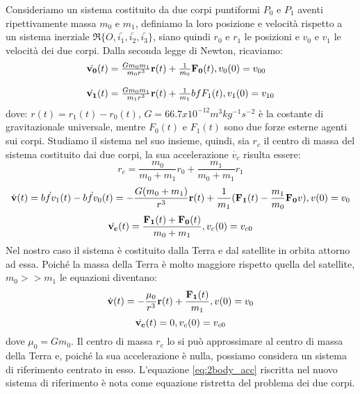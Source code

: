 Consideriamo un sistema costituito da due corpi puntiformi $P_0$ e
$P_1$ aventi ripettivamente massa $m_0$ e $m_1$, definiamo la loro posizione e
velocità rispetto a un sistema inerziale $\mathfrak{R} \{
O,\bar{i_1},\bar{i_2},\bar{i_3}\}$, siano quindi $r_0$ e $r_1$ le posizioni e
$v_0$ e $v_1$ le velocità dei due corpi. Dalla seconda legge di Newton,
ricaviamo:
\begin{equation}
\begin{array}{l}
\dot{\bf v_0}(t)=\frac{Gm_0m_1}{m_0r^3}{\bf r}(t) +
\frac{1}{m_0}{\bf F_0}(t),v_0(0)=v_{00}\\\\
\dot{\bf v_1}(t)=\frac{Gm_0m_1}{m_1r^3}{\bf r}(t) +
\frac{1}{m_1}{bf F_1}(t),v_1(0)=v_{10}
\end{array}
\end{equation}
dove: $r(t)=r_1(t)-r_0(t)$, $G=66.7x10^{-12} m^3kg^{-1}s^{-2}$ è la costante di
gravitazionale universale, mentre $F_0(t)$ e $F_1(t)$ sono due forze esterne
agenti sui corpi.
Studiamo il sistema nel suo insieme, quindi, sia $r_c$ il centro di massa del
sistema costituito dai due corpi, la sua accelerazione $\dot{v_c}$ risulta essere:
\[r_c=\frac{m_0}{m_0+m_1}r_0+\frac{m_1}{m_0+m_1}r_1\]
\begin{equation}
\dot{\bf v}(t)=\dot{bf v_1}(t)-\dot{bf v_0}(t)=-\frac{G(m_0+m_1)}{r^3}{\bf
r}(t)+\frac{1}{m_1}({\bf F_1}(t)-\frac{m_1}{m_0}{\bf F_0}v), v(0)=v_0
\end{equation}
\begin{equation}
\dot{\bf v_c}(t)=\frac{{\bf F_1}(t)+{\bf F_0}(t)}{m_0+m_1},v_c(0)=v_{c0}
\end{equation}
Nel nostro caso il sistema è costituito dalla Terra e dal satellite in orbita
attorno ad essa. Poiché la massa della Terra è molto maggiore rispetto quella
del satellite, $m_0>>m_1$ le equazioni diventano:
\begin{equation}
\dot{\bf v}(t)=-\frac{\mu_0}{r^3}{\bf r}(t)+\frac{{\bf F_1}(t)}{m_1}, v(0)=v_0
\label{eq:2body_acc}
\end{equation}
\begin{equation}
\dot{\bf v_c}(t)=0, v_c(0)=v_{c0}
\end{equation}
dove $\mu_0=Gm_0$.
Il centro di massa $r_c$ lo si può approssimare al centro di massa della Terra
e, poiché la sua accelerazione è nulla, possiamo considera un sistema di
riferimento centrato in esso. L'equazione \ref{eq:2body_acc} riscritta
nel nuovo sistema di riferimento è nota come equazione ristretta del problema
dei due corpi.

